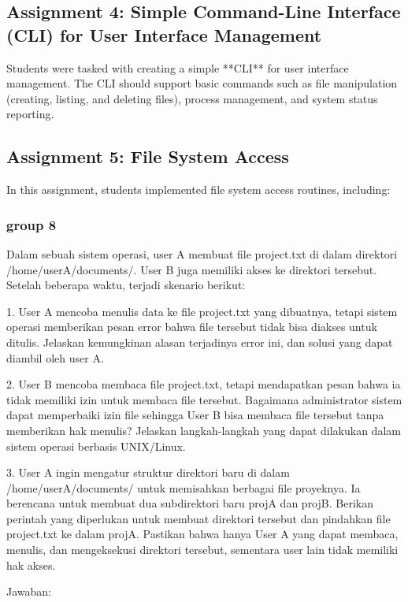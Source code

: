 \documentclass[12pt]{article}
\begin{document}
\subsection{Assignment 4: Simple Command-Line Interface (CLI) for User Interface Management}
Students were tasked with creating a simple **CLI** for user interface management. The CLI should support basic commands such as file manipulation (creating, listing, and deleting files), process management, and system status reporting.

\subsection{Assignment 5: File System Access}
In this assignment, students implemented file system access routines, including:
\subsubsection{group 8} 
Dalam sebuah sistem operasi, user A membuat file project.txt di dalam direktori /home/userA/documents/. User B juga memiliki akses ke direktori tersebut. Setelah beberapa waktu, terjadi skenario berikut:

1. User A mencoba menulis data ke file project.txt yang dibuatnya, tetapi sistem operasi memberikan pesan error bahwa file tersebut tidak bisa diakses untuk ditulis. Jelaskan kemungkinan alasan terjadinya error ini, dan solusi yang dapat diambil oleh user A.
   
2. User B mencoba membaca file project.txt, tetapi mendapatkan pesan bahwa ia tidak memiliki izin untuk membaca file tersebut. Bagaimana administrator sistem dapat memperbaiki izin file sehingga User B bisa membaca file tersebut tanpa memberikan hak menulis? Jelaskan langkah-langkah yang dapat dilakukan dalam sistem operasi berbasis UNIX/Linux.

3. User A ingin mengatur struktur direktori baru di dalam /home/userA/documents/ untuk memisahkan berbagai file proyeknya. Ia berencana untuk membuat dua subdirektori baru projA dan projB. Berikan perintah yang diperlukan untuk membuat direktori tersebut dan pindahkan file project.txt ke dalam projA. Pastikan bahwa hanya User A yang dapat membaca, menulis, dan mengeksekusi direktori tersebut, sementara user lain tidak memiliki hak akses.

Jawaban:
\end{document}
